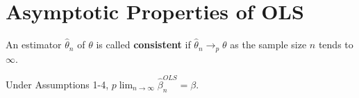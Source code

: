 \documentclass[notes=show]{beamer}
\begin{document}
\section{Asymptotic Properties of OLS}

\begin{frame}%


\begin{definition}
An estimator $\hat{\theta}_{n}$ of $\theta $ is called \textbf{consistent}
if $\hat{\theta}_{n}\rightarrow _{p}\theta $ as the sample size $n$ tends to 
$\infty $.
\end{definition}

\end{frame}%

\begin{frame}%


\begin{theorem}[Consistency]
Under Assumptions 1-4, $p\lim_{n\rightarrow \infty }\widehat{\beta }%
_{n}^{OLS}=\beta .$
\end{theorem}

\end{frame}%
\end{document}
